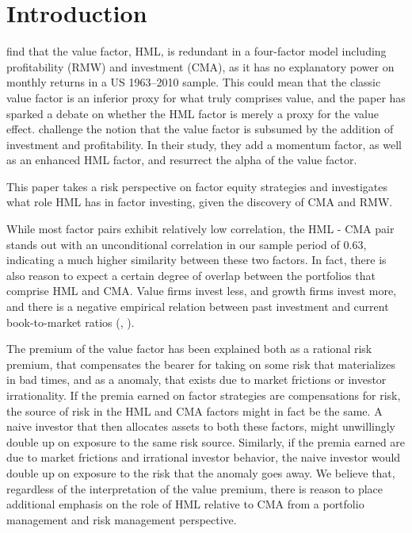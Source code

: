 \section{Introduction}
\textcite{FF2015} find that the value factor, HML, is redundant in a four-factor model including profitability (RMW) and investment (CMA), as it has no explanatory power on monthly returns in a US 1963–2010 sample. This could mean that the classic value factor is an inferior proxy for what truly comprises value, and the paper has sparked a debate on whether the HML factor is merely a proxy for the value effect. \textcite{Asness2015} challenge the notion that the value factor is subsumed by the addition of investment and profitability. In their study, they add a momentum factor, as well as an enhanced HML factor, and resurrect the alpha of the value factor.

This paper takes a risk perspective on factor equity strategies and investigates what role HML has in factor investing, given the discovery of CMA and RMW.

While most factor pairs exhibit relatively low correlation, the HML - CMA pair stands out with an unconditional correlation in our sample period of 0.63, indicating a much higher similarity between these two factors. In fact, there is also reason to expect a certain degree of overlap between the portfolios that comprise HML and CMA. Value firms invest less, and growth firms invest more, and there is a negative empirical relation between past investment and current book-to-market ratios (\textcite{Zhang2005}, \textcite{AndersonGarciaFeijoo2006}). 

The premium of the value factor has been explained both as a rational risk premium, that compensates the bearer for taking on some risk that materializes in bad times, and as a anomaly, that exists due to market frictions or investor irrationality. If the premia earned on factor strategies are compensations for risk, the source of risk in the HML and CMA factors might in fact be the same. A naive investor that then allocates assets to both these factors, might unwillingly double up on exposure to the same risk source. Similarly, if the premia earned are due to market frictions and irrational investor behavior, the naive investor would double up on exposure to the risk that the anomaly goes away. We believe that, regardless of the interpretation of the value premium, there is reason to place additional emphasis on the role of HML relative to CMA from a portfolio management and risk management perspective.


